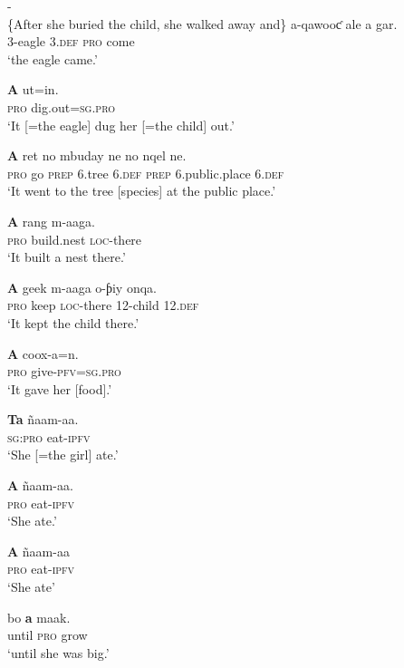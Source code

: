 \documentclass[output=paper
,newtxmath
,modfonts
,nonflat]{langsci/langscibook}
\begin{document}
\ea\label{ex:apel:16}
{- \citep[283]{Faye1979}}\\
{\{After she buried the child, she walked away and\}}
\ea\label{ex:apel:16a}
\gll a-qawooƈ ale a gar.\\
     \textsc{3-}eagle \textsc{3.def} \textsc{pro} come \\
\glt ‘the eagle came.’

\ex\label{ex:apel:16b}
\gll \textbf{A}  ut=in.\\
     \textsc{pro} dig.out\textsc{=sg.pro} \\
\glt ‘It [=the eagle] dug her [=the child] out.’

\ex\label{ex:apel:16c}
\gll \textbf{A} ret no mbuday ne no nqel ne.         \\
     \textsc{pro} go \textsc{prep} \textsc{6.}tree \textsc{6.def} \textsc{prep} 6.public.place \textsc{6.def} \\
\glt ‘It went to the tree [species] at the public place.’   

\ex\label{ex:apel:16d}
\gll \textbf{A} rang m-aaga.  \\
     \textsc{pro} build.nest \textsc{loc-}there \\
\glt ‘It built a nest there.’

\ex\label{ex:apel:16e}
\gll \textbf{A} geek m-aaga o-ƥiy onqa.  \\
     \textsc{pro} keep \textsc{loc-}there \textsc{12-}child \textsc{12.def}\\
\glt ‘It kept the child there.’


\ex\label{ex:apel:16f}
\gll \textbf{A} coox-a=n.\\
     \textsc{pro} give\textsc{-pfv=sg.pro}\\
\glt ‘It gave her [food].’


\ex\label{ex:apel:16g}
\gll \textbf{Ta} ñaam-aa.\\
     \textsc{sg:pro} eat\textsc{-ipfv} \\
\glt ‘She [=the girl] ate.’


\ex\label{ex:apel:16h}
\gll \textbf{A} ñaam-aa. \\
     \textsc{pro} eat\textsc{-ipfv}\\
\glt ‘She ate.’


\ex\label{ex:apel:16i}
\gll \textbf{A} ñaam-aa\\
     \textsc{pro} eat\textsc{-ipfv}\\
\glt ‘She ate’


\ex\label{ex:apel:16j}
\gll bo \textbf{a} maak.\\
     until \textsc{pro} grow\\
\glt ‘until she was big.’
\end{document}

